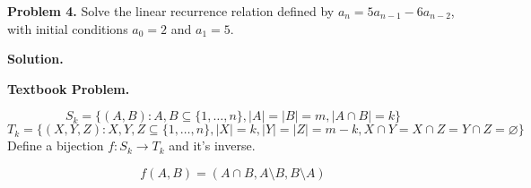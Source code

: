\textbf{Problem 4.} Solve the linear recurrence relation defined by
$ a_n=5a_{n-1}-6a_{n-2} $, with initial conditions $ a_0=2 $
and $ a_1=5 $.

\textbf{Solution.}

\textbf{Textbook Problem.}

\[ S_k=\{(A,B): A,B\subseteq \{1,\ldots ,n\},|A|=|B|=m,|A\cap B|=k\} \]
\[ T_k=\{(X,Y,Z):X,Y,Z\subseteq \{1,\ldots ,n\},|X|=k,|Y|=|Z|=m-k,
X\cap Y=X\cap Z=Y\cap Z=\varnothing\} \]
Define a bijection $ f:S_k\rightarrow T_k $ and it's inverse.

\[ f(A,B)=(A\cap B, A\setminus B, B\setminus A) \]
